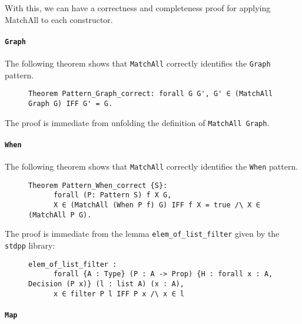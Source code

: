 \documentclass[11pt]{article}
\newcommand{\inlinecoq}[1]{\mbox{\lstinline[style=customcoq,columns=fixed,basewidth=.48em]{#1}}}
\newcommand{\ilc}[1]{\inlinecoq{#1}}
\begin{document}
With this, we can have a correctness and completeness proof for applying MatchAll to each constructor.

\paragraph{\ilc{Graph}}

The following theorem shows that \ilc{MatchAll} correctly identifies the \ilc{Graph} pattern.

\begin{figure}[h]
  \label{fig:sem_graph}
  \begin{lstlisting}[style=customcoq,basicstyle=\small\ttfamily]
    Theorem Pattern_Graph_correct: forall G G', G' ∈ (MatchAll Graph G) IFF G' = G.
  \end{lstlisting}
\end{figure}

The proof is immediate from unfolding the definition of \ilc{MatchAll Graph}.

\paragraph{\ilc{When}}

The following theorem shows that \ilc{MatchAll} correctly identifies the \ilc{When} pattern.

\begin{figure}[H]
  \label{fig:sem_when}
  \begin{lstlisting}[style=customcoq,basicstyle=\small\ttfamily]
    Theorem Pattern_When_correct {S}:
      forall (P: Pattern S) f X G,
      X ∈ (MatchAll (When P f) G) IFF f X = true /\ X ∈ (MatchAll P G).
  \end{lstlisting}
\end{figure}

The proof is immediate from the lemma \ilc{elem_of_list_filter} given by the \ilc{stdpp} library:

\begin{figure}[H]
  \label{fig:list_filter}
  \begin{lstlisting}[style=customcoq,basicstyle=\small\ttfamily]
    elem_of_list_filter :
      forall {A : Type} (P : A -> Prop) {H : forall x : A, Decision (P x)} (l : list A) (x : A),
      x ∈ filter P l IFF P x /\ x ∈ l
  \end{lstlisting}
\end{figure}

\paragraph{\ilc{Map}}
\end{document}

